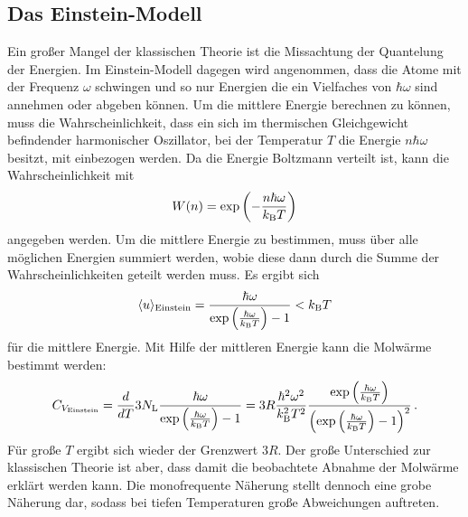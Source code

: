 \subsection{Das Einstein-Modell}
Ein großer Mangel der klassischen Theorie ist die Missachtung der Quantelung der Energien. Im Einstein-Modell dagegen wird angenommen, dass die Atome mit der Frequenz $\omega$ schwingen und so nur Energien die ein Vielfaches von $\hbar\omega$ sind annehmen oder abgeben können.
Um die mittlere Energie berechnen zu können, muss die Wahrscheinlichkeit, dass ein sich im thermischen Gleichgewicht befindender harmonischer Oszillator, bei der Temperatur $T$ die Energie $n\hbar\omega$ besitzt, mit einbezogen werden. Da die Energie Boltzmann verteilt ist, kann die Wahrscheinlichkeit mit
\begin{equation*}
	W(n) = \exp{\left(-\frac{n\hbar \omega}{k_\text B T}\right)}
\end{equation*}
angegeben werden.
Um die mittlere Energie zu bestimmen, muss über alle möglichen Energien summiert werden, wobie diese dann durch die Summe der Wahrscheinlichkeiten geteilt werden muss.
Es ergibt sich
\begin{equation*}
	\langle u \rangle _\text{Einstein} = \frac{\hbar\omega}{\exp{\left(\frac{\hbar\omega}{k_\text B T}\right)} - 1}  < k_\text B T
\end{equation*}
für die mittlere Energie.
Mit Hilfe der mittleren Energie kann die Molwärme bestimmt werden:
\begin{equation}
	C_{V_\text{Einstein}} = \frac{d}{dT}3 N_\text L \frac{\hbar\omega}{\exp{\left(\frac{\hbar\omega}{k_\text B T}\right)} - 1} = 3R \frac{\hbar^2\omega^2}{k_\text B ^2 T^2} \frac{\exp{\left(\frac{\hbar\omega}{k_\text B T}\right)}}{\left(\exp{\left(\frac{\hbar\omega}{k_\text B T}\right)}-1\right)^2}\,\text.
	\label{eqn:cv}
\end{equation}
Für große $T$ ergibt sich wieder der Grenzwert $3R$.
Der große Unterschied zur klassischen Theorie ist aber, dass damit die beobachtete Abnahme der Molwärme erklärt werden kann.
Die monofrequente Näherung stellt dennoch eine grobe Näherung dar, sodass bei tiefen Temperaturen große Abweichungen auftreten.
